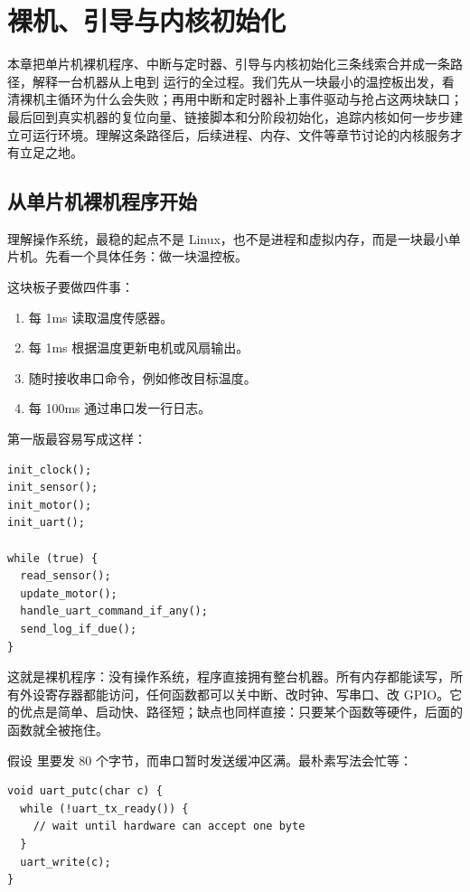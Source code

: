 \chapter{裸机、引导与内核初始化}

本章把单片机裸机程序、中断与定时器、引导与内核初始化三条线索合并成一条路径，解释一台机器从上电到  运行的全过程。我们先从一块最小的温控板出发，看清裸机主循环为什么会失败；再用中断和定时器补上事件驱动与抢占这两块缺口；最后回到真实机器的复位向量、链接脚本和分阶段初始化，追踪内核如何一步步建立可运行环境。理解这条路径后，后续进程、内存、文件等章节讨论的内核服务才有立足之地。

\section{从单片机裸机程序开始}

理解操作系统，最稳的起点不是 Linux，也不是进程和虚拟内存，而是一块最小单片机。先看一个具体任务：做一块温控板。

这块板子要做四件事：

\begin{enumerate}
\tightlist
\item 每 1ms 读取温度传感器。
\item 每 1ms 根据温度更新电机或风扇输出。
\item 随时接收串口命令，例如修改目标温度。
\item 每 100ms 通过串口发一行日志。
\end{enumerate}

第一版最容易写成这样：

\begin{lstlisting}
init_clock();
init_sensor();
init_motor();
init_uart();

while (true) {
  read_sensor();
  update_motor();
  handle_uart_command_if_any();
  send_log_if_due();
}
\end{lstlisting}

这就是裸机程序：没有操作系统，程序直接拥有整台机器。所有内存都能读写，所有外设寄存器都能访问，任何函数都可以关中断、改时钟、写串口、改 GPIO。它的优点是简单、启动快、路径短；缺点也同样直接：只要某个函数等硬件，后面的函数就全被拖住。

假设  里要发 80 个字节，而串口暂时发送缓冲区满。最朴素写法会忙等：

\begin{lstlisting}
void uart_putc(char c) {
  while (!uart_tx_ready()) {
    // wait until hardware can accept one byte
  }
  uart_write(c);
}
\end{lstlisting}

